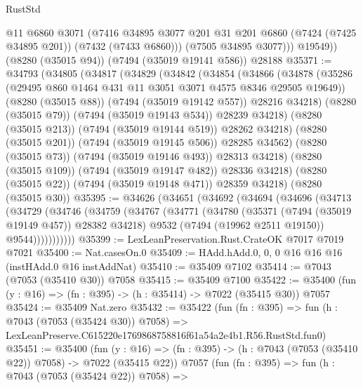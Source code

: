 \begin{lexlean}{RustStd}
\begin{coremodule}
            @11
            @6860
            @3071
            (@7416
              @34895
              @3077
              @201
              @31
              @201
              @6860
              (@7424 (@7425 @34895 @201))
              (@7432 (@7433 @6860)))
            (@7505 @34895 @3077)))
        @19549))
    (@8280 (@35015 @94))
    (@7494 (@35019 @19141 @586))
    @28188
@35371 := @34793
    (@34805
      (@34817
        (@34829
          (@34842
            (@34854
              (@34866
                (@34878
                  (@35286 (@29495 @860 @1464 @431 @11 @3051 @3071 @4575 @8346 @29505 @19649))
                  (@8280 (@35015 @88))
                  (@7494 (@35019 @19142 @557))
                  @28216
                  @34218)
                (@8280 (@35015 @79))
                (@7494 (@35019 @19143 @534))
                @28239
                @34218)
              (@8280 (@35015 @213))
              (@7494 (@35019 @19144 @519))
              @28262
              @34218)
            (@8280 (@35015 @201))
            (@7494 (@35019 @19145 @506))
            @28285
            @34562)
          (@8280 (@35015 @73))
          (@7494 (@35019 @19146 @493))
          @28313
          @34218)
        (@8280 (@35015 @109))
        (@7494 (@35019 @19147 @482))
        @28336
        @34218)
      (@8280 (@35015 @22))
      (@7494 (@35019 @19148 @471))
      @28359
      @34218)
    (@8280 (@35015 @30))
@35395 := @34626
    (@34651
      (@34692
        (@34694
          (@34696
            (@34713
              (@34729
                (@34746
                  (@34759
                    (@34767
                      (@34771
                        (@34780
                          (@35371 (@7494 (@35019 @19149 @457)) @28382 @34218)
                          @9532
                          (@7494 (@19962 @2511 @19150))
                          @9544)))))))))))
@35399 := LexLeanPreservation.Rust.CrateOK @7017 @7019 @7021
@35400 := Nat.casesOn.{0}
@35409 := HAdd.hAdd.{0, 0, 0} @16 @16 @16 (instHAdd.{0} @16 instAddNat)
@35410 := @35409 @7102
@35414 := @7043 (@7053 (@35410 @30)) @7058
@35415 := @35409 @7100
@35422 := @35400 (fun (y : @16) => (fn : @395) -> (h : @35414) -> @7022 (@35415 @30)) @7057
@35424 := @35409 Nat.zero
@35432 := @35422
    (fun (fn : @395) =>
    fun (h : @7043 (@7053 (@35424 @30)) @7058) =>
    LexLeanPreserve.C615220e1769868758816f61a54a2e4b1.R56.RustStd.fun0)
@35451 := @35400
    (fun (y : @16) => (fn : @395) -> (h : @7043 (@7053 (@35410 @22)) @7058) -> @7022 (@35415 @22))
    @7057
    (fun (fn : @395) =>
    fun (h : @7043 (@7053 (@35424 @22)) @7058) =>

\end{coremodule}
\end{lexlean}
